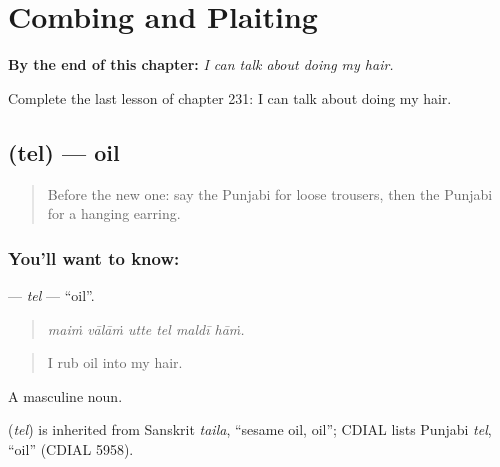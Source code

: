
\chapter{Combing and Plaiting}
\label{ch:pa-a2-combing-and-plaiting}

\begin{chapteropening}
\textbf{By the end of this chapter:} \emph{I can talk about doing my hair.}

Complete the last lesson of chapter 231: I can talk about doing my hair.
\end{chapteropening}

\section[\texorpdfstring{\pa{ਤੇਲ} (tel)}{ਤੇਲ (tel)}]{ (tel) — oil}

\label{lesson:PA-C231-tel}



\begin{quote}
Before the new one: say the Punjabi for loose trousers, then the Punjabi for a hanging earring.
\end{quote}

\subsection*{You'll want to know: }
\textbf{} — \emph{tel} — \textquotedblleft{}oil\textquotedblright{}.

\begin{quote}
     
\end{quote}

\begin{quote}
\emph{maiṁ vālāṁ utte tel maldī hāṁ.}
\end{quote}

\begin{quote}
I rub oil into my hair.
\end{quote}

A masculine noun.

\begin{cousinweb}
\textbf{} (\emph{tel}) is inherited from Sanskrit \emph{taila}, \textquotedblleft{}sesame oil, oil\textquotedblright{}; CDIAL lists Punjabi \emph{tel}, \textquotedblleft{}oil\textquotedblright{} (CDIAL 5958).
\end{cousinweb}

